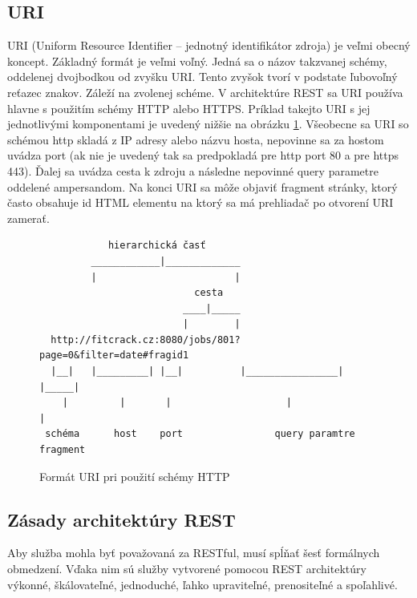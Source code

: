 \documentclass[slovak]{fitthesis}
\begin{document}
\subsection{URI} \label{URI}
URI (Uniform Resource Identifier – jednotný identifikátor zdroja) je veľmi obecný koncept. Základný formát je veľmi voľný. Jedná sa o názov takzvanej schémy, oddelenej dvojbodkou od zvyšku URI. Tento zvyšok tvorí v podstate ľubovoľný reťazec znakov. Záleží na zvolenej schéme\cite{URIRFC}. V architektúre REST sa URI používa hlavne s použitím schémy HTTP alebo HTTPS. Príklad takejto URI s jej jednotlivými komponentami je uvedený nižšie na obrázku \ref{fig:formatURI}. Všeobecne sa URI so schémou http skladá z IP adresy alebo názvu hosta, nepovinne sa za hostom uvádza port (ak nie je uvedený tak sa predpokladá pre http port 80 a pre https 443). Ďalej sa uvádza cesta k zdroju a následne nepovinné query parametre oddelené ampersandom. Na konci URI sa môže objaviť fragment stránky, ktorý často obsahuje id HTML elementu na ktorý sa má prehliadač po otvorení URI zamerať.



\begin{figure}[H]
\begin{center}
\begin{varwidth}{\linewidth}
\begin{verbatim}
            hierarchická časť
         ____________|_____________                  
         |                        |
                           cesta
                         ____|_____
                         |        |
  http://fitcrack.cz:8080/jobs/801?page=0&filter=date#fragid1
  |__|   |_________| |__|          |________________| |_____|
    |         |       |                    |               |
 schéma      host    port                query paramtre  fragment

\end{verbatim}
\end{varwidth}
\end{center}
\caption{Formát URI pri použití schémy HTTP}
\label{fig:formatURI}
\end{figure}



\subsection{Zásady architektúry REST} \label{zasadyREST}
Aby služba mohla byť považovaná za RESTful, musí spĺňať šesť formálnych obmedzení. Vďaka nim sú služby vytvorené pomocou REST architektúry výkonné, škálovateľné, jednoduché, ľahko upraviteľné, prenositeľné a spoľahlivé.
\end{document}
